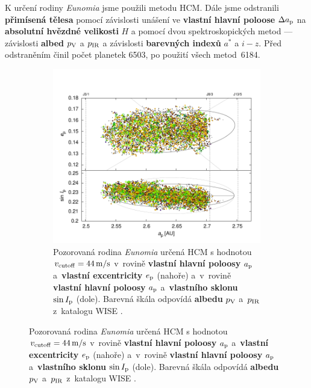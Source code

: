 \documentclass{beamer}
\newlength{\vyska}
\newlength{\vyskaB}
\newlength{\main}
\begin{document}
\begin{frame}
\begin{columns}[t]
\begin{column}{\main}
\begin{tcolorbox}[title=Výsledky\phantom{Úy},height=\vyskaB]
	\vspace{-1cm}
		K určení rodiny \textit{Eunomia} jsme použili metodu HCM. Dále jsme odstranili \textbf{přimísená tělesa} pomocí závislosti unášení ve \textbf{vlastní hlavní poloose} $\Delta a_{\rm p}$ na \textbf{absolutní hvězdné velikosti} $H$ a pomocí dvou spektroskopických metod --- závislosti \textbf{albed} $p_{\rm V}$ a $p_{\rm IR}$ a závislosti \textbf{barevných indexů} $a^*$ a $i-z$. Před odstraněním činil počet planetek 6503, po použití všech metod~6184.
	\begin{figure}[!htb]
		\begin{subfigure}[b]{0.3\textwidth}
			\centering
			\includegraphics[width=1.0\textwidth]{../obr/ae_ai_wise}
			\caption{Pozorovaná rodina \textit{Eunomia} určená HCM s hodnotou $v_{\rm cutoff} = 44\,{\rm m/s}$ v~rovině \textbf{vlastní hlavní poloosy} $a_{\rm p}$ a~\textbf{vlastní excentricity} $e_{\rm p}$ (nahoře) a~v~rovině \textbf{vlastní hlavní poloosy} $a_{\rm p}$ a~\textbf{vlastního sklonu} $\sin I_{\rm p}$ (dole). Barevná škála odpovídá \textbf{albedu} $p_{\rm V}$ a~$p_{\rm IR}$ z~katalogu WISE \cite{nugent15}.}

\end{subfigure}
\end{figure}
\end{tcolorbox}
\end{column}
\end{columns}
\end{frame}
\end{document}
